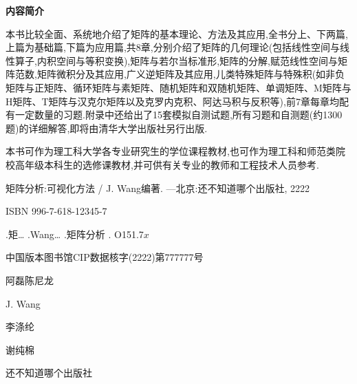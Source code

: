 \newpage
{}
\thispagestyle{empty}

\centerline{\textbf{内容简介}}
\vspace{0.8em}
{

本书比较全面、系统地介绍了矩阵的基本理论、方法及其应用,全书分上、下两篇,上篇为基础篇,下篇为应用篇,共8章,分别介绍了矩阵的几何理论(包括线性空间与线性算子,内积空间与等积变换),矩阵与若尔当标准形,矩阵的分解,赋范线性空间与矩阵范数,矩阵微积分及其应用,广义逆矩阵及其应用,儿类特殊矩阵与特殊积(如非负矩阵与正矩阵、循环矩阵与素矩阵、随机矩阵和双随机矩阵、单调矩阵、M矩阵与H矩阵、T矩阵与汉克尔矩阵以及克罗内克积、阿达马积与反积等),前7章每章均配有一定数量的习题.附录中还给出了15套模拟自测试题,所有习题和自测题(约1300题)的详细解答,即将由清华大学出版社另行出版.

本书可作为理工科大学各专业研究生的学位课程教材,也可作为理工科和师范类院校高年级本科生的选修课教材,并可供有关专业的教师和工程技术人员参考.

\vfill

\noindent{}

\vspace{2em}

\begin{minipage}{0.9\linewidth}

    \vspace{1em}

    矩阵分析:可视化方法 / J. Wang编著. —北京:还不知道哪个出版社, 2222

    ISBN 996-7-618-12345-7

    .矩… \quad {}.Wang… \quad {}.矩阵分析 \quad {}. O151.7$x$ \quad 

    中国版本图书馆CIP数据核字(2222)第777777号
\end{minipage}

\vfill

\noindent{} 阿\quad 磊\quad 陈尼龙 \par
\noindent{} J. Wang \par
\noindent{} 李涤纶 \par
\noindent{} 谢纯棉

\vspace{2em}
\noindent{} 还不知道哪个出版社

}
